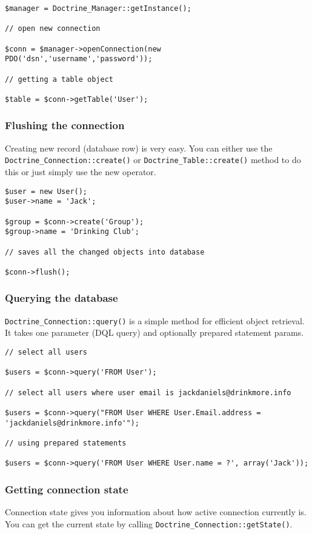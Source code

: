 \documentclass[11pt,a4paper]{report}
\begin{document}
\begin{verbatim}
$manager = Doctrine_Manager::getInstance();

// open new connection

$conn = $manager->openConnection(new PDO('dsn','username','password'));

// getting a table object

$table = $conn->getTable('User');
\end{verbatim}

\subsubsection{Flushing the connection}
Creating new record (database row) is very easy. You can either use the \texttt{Doctrine\_Connection::create()} or \texttt{Doctrine\_Table::create()} method to do this or just simply use the new operator.

\begin{verbatim}
$user = new User();
$user->name = 'Jack';

$group = $conn->create('Group');
$group->name = 'Drinking Club';

// saves all the changed objects into database

$conn->flush();
\end{verbatim}

\subsubsection{Querying the database}
\texttt{Doctrine\_Connection::query()} is a simple method for efficient object retrieval. It takes one parameter (DQL query) and optionally prepared statement params.

\begin{verbatim}
// select all users

$users = $conn->query('FROM User');

// select all users where user email is jackdaniels@drinkmore.info

$users = $conn->query("FROM User WHERE User.Email.address = 'jackdaniels@drinkmore.info'");

// using prepared statements

$users = $conn->query('FROM User WHERE User.name = ?', array('Jack'));
\end{verbatim}

\subsubsection{Getting connection state}
Connection state gives you information about how active connection currently is. You can get the current state by calling \texttt{Doctrine\_Connection::getState()}.
\end{document}
